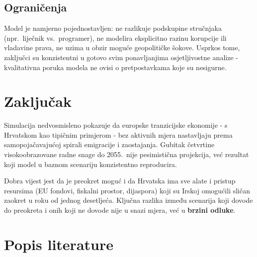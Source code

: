 \documentclass[11pt,a4paper]{article}
\begin{document}
\subsection*{Ograničenja}

Model je namjerno pojednostavljen: ne razlikuje podskupine stručnjaka (npr.\ liječnik vs.\ programer), ne modelira eksplicitno razinu korupcije ili vladavine prava, ne uzima u obzir moguće geopolitičke šokove. Usprkos tome, zaključci su konzistentni u gotovo svim ponavljanjima osjetljivostne analize  - kvalitativna poruka modela ne ovisi o pretpostavkama koje su nesigurne.

\section*{Zaključak}

Simulacija nedvosmisleno pokazuje da europske tranzicijske ekonomije  - s Hrvatskom kao tipičnim primjerom  - bez aktivnih mjera nastavljaju prema samopojačavajućoj spirali emigracije i zaostajanja. Gubitak četvrtine visokoobrazovane radne snage do 2055.\ nije pesimistična projekcija, već rezultat koji model u baznom scenariju konzistentno reproducira.

Dobra vijest jest da je preokret moguć i da Hrvatska ima sve alate i pristup resursima (EU fondovi, fiskalni prostor, dijaspora) koji su Irskoj omogućili sličan zaokret u roku od jednog desetljeća. Ključna razlika između scenarija koji dovode do preokreta i onih koji ne dovode nije u snazi mjera, već u \textbf{brzini odluke}.

\section*{Popis literature}
\end{document}

